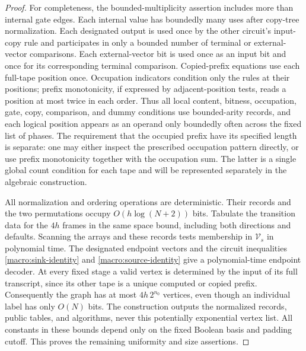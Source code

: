 \begin{proof}
For completeness, the bounded-multiplicity assertion includes more
than internal gate edges.  Each internal value has boundedly many
uses after copy-tree normalization.  Each designated output is used
once by the other circuit's input-copy rule and participates in only
a bounded number of terminal or external-vector comparisons.  Each
external-vector bit is used once as an input bit and once for its
corresponding terminal comparison.  Copied-prefix equations use each
full-tape position once.  Occupation indicators condition only the
rules at their positions; prefix monotonicity, if expressed by
adjacent-position tests, reads a position at most twice in each
order.  Thus all local content, bitness, occupation, gate, copy,
comparison, and dummy conditions use bounded-arity records, and each
logical position appears as an operand only boundedly often across
the fixed list of phases.  The requirement that the occupied prefix
have its specified length is separate: one may either inspect the
prescribed occupation pattern directly, or use prefix monotonicity
together with the occupation sum.  The latter is a single global
count condition for each tape and will be represented separately in
the algebraic construction.

All normalization and ordering operations are deterministic.  Their
records and the two permutations occupy $O(h\log(N+2))$ bits.
Tabulate the transition data for the $4h$ frames in the same space
bound, including both directions and defaults.  Scanning the arrays
and these records tests membership in $\mathcal V_s$ in polynomial
time.  The designated endpoint vectors and the circuit inequalities
\eqref{macro:sink-identity} and \eqref{macro:source-identity} give a
polynomial-time endpoint decoder.  At every fixed stage a valid
vertex is determined by the input of its full transcript, since
its other tape is a unique computed or copied prefix.  Consequently
the graph has at most $4h\,2^{n_0}$ vertices, even though an individual
label has only $O(N)$ bits.  The construction outputs the normalized
records, public tables, and algorithms, never this potentially
exponential vertex list.  All constants in these bounds depend only
on the fixed Boolean basis and padding cutoff.  This proves the
remaining uniformity and size assertions.
\end{proof}
